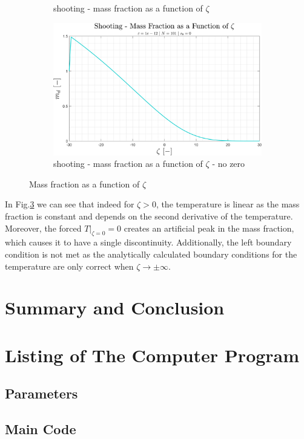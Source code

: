 \documentclass[11pt, a4paper]{article}
\begin{document}
\begin{figure}[H]
\begin{subfigure}[c]{0.49\textwidth}
        \caption{shooting - mass fraction as a function of $\zeta$}
        \label{fig: shooting - md vs zeta}
    \end{subfigure}
    \begin{subfigure}[c]{0.55\textwidth}
        \centering
        \includegraphics[width=\textwidth]{images/shooting - md vs zeta - no zero.png}
        \caption{shooting - mass fraction as a function of $\zeta$ - no zero}
        \label{fig: shooting - md vs zeta - no zero}
    \end{subfigure}
    \caption{Mass fraction as a function of $\zeta$}
    \label{fig: md vs zeta}
\end{figure}
\noindent In Fig.\ref{fig: md vs zeta} we can see that indeed for $\zeta>0$, the temperature is linear as the mass fraction is constant and depends on the second derivative of the temperature. Moreover, the forced $\left.T\right|_{\zeta=0}=0$ creates an artificial peak in the mass fraction, which causes it to have a single discontinuity. Additionally, the left boundary condition is not met as the analytically calculated boundary conditions for the temperature are only correct when $\zeta\rightarrow\pm\infty$.

\section{Summary and Conclusion}

\newpage
\appendix
\section{Listing of The Computer Program}
\subsection{Parameters}

\subsection{Main Code}
\end{document}
